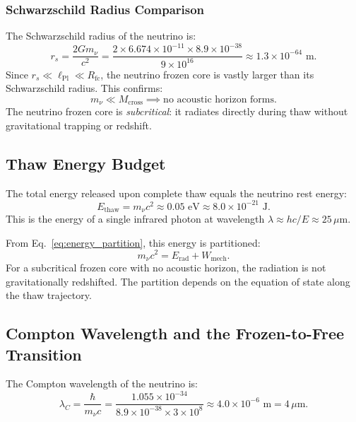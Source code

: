 \documentclass[11pt,a4paper]{article}
\newcommand{\lPl}{\ensuremath{\ell_{\mathrm{Pl}}}}
\newcommand{\Rfc}{\ensuremath{R_{\mathrm{fc}}}}
\newcommand{\Mcross}{\ensuremath{M_{\mathrm{cross}}}}
\theoremstyle{definition}
\theoremstyle{remark}
\begin{document}
\subsubsection{Schwarzschild Radius Comparison}

The Schwarzschild radius of the neutrino is:
\begin{equation}
r_s = \frac{2 G m_\nu}{c^2} = \frac{2 \times 6.674 \times 10^{-11} \times 8.9 \times 10^{-38}}{9 \times 10^{16}} \approx 1.3 \times 10^{-64} \text{ m}.
\end{equation}
Since $r_s \ll \lPl \ll \Rfc$, the neutrino frozen core is vastly larger than its Schwarzschild radius. This confirms:
\begin{equation}
m_\nu \ll \Mcross \implies \text{no acoustic horizon forms.}
\end{equation}
The neutrino frozen core is \emph{subcritical}: it radiates directly during thaw without gravitational trapping or redshift.

\subsection{Thaw Energy Budget}
\label{sec:neutrino_energy}

The total energy released upon complete thaw equals the neutrino rest energy:
\begin{equation}
E_{\mathrm{thaw}} = m_\nu c^2 \approx 0.05 \text{ eV} \approx 8.0 \times 10^{-21} \text{ J}.
\end{equation}
This is the energy of a single infrared photon at wavelength $\lambda \approx hc/E \approx 25\,\mu$m.

\vspace{0.5em}
\noindent
From Eq.~\ref{eq:energy_partition}, this energy is partitioned:
\begin{equation}
m_\nu c^2 = E_{\mathrm{rad}} + W_{\mathrm{mech}}.
\end{equation}
For a subcritical frozen core with no acoustic horizon, the radiation is not gravitationally redshifted. The partition depends on the equation of state along the thaw trajectory.

\subsection{Compton Wavelength and the Frozen-to-Free Transition}
\label{sec:compton_transition}

The Compton wavelength of the neutrino is:
\begin{equation}
\lambda_C = \frac{\hbar}{m_\nu c} = \frac{1.055 \times 10^{-34}}{8.9 \times 10^{-38} \times 3 \times 10^8} \approx 4.0 \times 10^{-6} \text{ m} = 4\,\mu\text{m}.
\end{equation}
\end{document}
